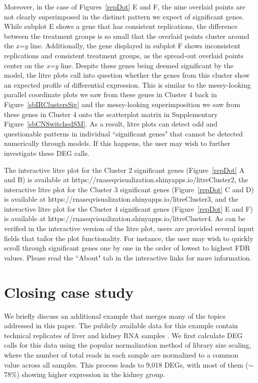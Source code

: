 \documentclass[11pt,a4paper,oldfontcommands,openany]{memoir}
\numberwithin{equation}{section} %
\begin{document}
Moreover, in the case of Figures~\ref{repDot} E and F, the nine overlaid points are not clearly superimposed in the distinct pattern we expect of significant genes. While subplot E shows a gene that has consistent replications, the difference between the treatment groups is so small that the overlaid points cluster around the \textit{x=y} line. Additionally, the gene displayed in subplot F shows inconsistent replications and consistent treatment groups, as the spread-out overlaid points center on the \textit{x=y} line. Despite these genes being deemed significant by the model, the litre plots call into question whether the genes from this cluster show an expected profile of differential expression. This is similar to the messy-looking parallel coordinate plots we saw from these genes in Cluster 4 back in Figure~\ref{sbIRClustersSig} and the messy-looking superimposition we saw from these genes in Cluster 4 onto the scatterplot matrix in Supplementary Figure~\ref{sbCNSwitchedSM}. As a result, litre plots can detect odd and questionable patterns in individual ``significant genes" that cannot be detected numerically through models. If this happens, the user may wish to further investigate these DEG calls.

The interactive litre plot for the Cluster 2 significant genes (Figure~\ref{repDot} A and B) is available at https://rnaseqvisualization.shinyapps.io/litreCluster2, the interactive litre plot for the Cluster 3 significant genes (Figure~\ref{repDot} C and D) is available at https://rnaseqvisualization.shinyapps.io/litreCluster3, and the interactive litre plot for the Cluster 4 significant genes (Figure~\ref{repDot} E and F) is available at https://rnaseqvisualization.shinyapps.io/litreCluster4. As can be verified in the interactive version of the litre plot, users are provided several input fields that tailor the plot functionality. For instance, the user may wish to quickly scroll through significant genes one by one in the order of lowest to highest FDR values. Please read the ``About" tab in the interactive links for more information.

\section{Closing case study}

We briefly discuss an additional example that merges many of the topics addressed in this paper. The publicly available data for this example contain technical replicates of liver and kidney RNA samples \citep{Marioni}. We first calculate DEG calls for this data using the popular normalization method of library size scaling, where the number of total reads in each sample are normalized to a common value across all samples. This process leads to 9,018 DEGs, with most of them ($\sim$78\%) showing higher expression in the kidney group.
\end{document}
